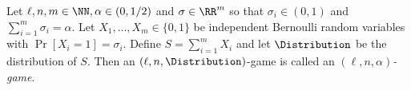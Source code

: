 
        
%


    \begin{definition}\label{def:xor-game-poisson}
        Let $\ell, n, m \in \NN, \alpha \in (0, 1/2)$ and 
        $\sigma \in \RR^m$ so that $\sigma_i \in (0, 1)$ and $\sum_{i=1}^m \sigma_i = \alpha$. 
        Let $X_1, \ldots, X_m \in \{0,1\}$ be independent Bernoulli random variables with 
        $\Pr[X_i = 1] = \sigma_i$. 
        Define $S = \sum_{i = 1}^m X_i$ 
        and let $\Distribution$ be the distribution of $S$.
        Then an $(\ell, n, \Distribution)$-game is called an 
        \emph{$(\ell, n, \alpha)$-game}.
    \end{definition}


